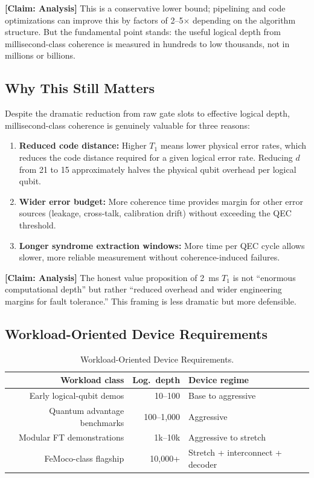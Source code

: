 \documentclass[conference]{IEEEtran}
\begin{document}
\textbf{[Claim: Analysis]} This is a conservative lower bound; pipelining and code optimizations can improve this by factors of 2--5$\times$ depending on the algorithm structure. But the fundamental point stands: the useful logical depth from millisecond-class coherence is measured in hundreds to low thousands, not in millions or billions.

\subsection{Why This Still Matters}

Despite the dramatic reduction from raw gate slots to effective logical depth, millisecond-class coherence is genuinely valuable for three reasons:

\begin{enumerate}
\item \textbf{Reduced code distance:} Higher $T_1$ means lower physical error rates, which reduces the code distance required for a given logical error rate. Reducing $d$ from 21 to 15 approximately halves the physical qubit overhead per logical qubit.
\item \textbf{Wider error budget:} More coherence time provides margin for other error sources (leakage, cross-talk, calibration drift) without exceeding the QEC threshold.
\item \textbf{Longer syndrome extraction windows:} More time per QEC cycle allows slower, more reliable measurement without coherence-induced failures.
\end{enumerate}

\textbf{[Claim: Analysis]} The honest value proposition of 2~ms $T_1$ is not ``enormous computational depth'' but rather ``reduced overhead and wider engineering margins for fault tolerance.'' This framing is less dramatic but more defensible.

\subsection{Workload-Oriented Device Requirements}

\begin{table}[htbp]
\centering
\caption{Workload-Oriented Device Requirements.}
\label{tab:workload_reqs}
\begin{tabular}{rrp{3cm}}
\toprule
\textbf{Workload class} & \textbf{Log.\ depth} & \textbf{Device regime} \\
\midrule
Early logical-qubit demos & 10--100 & Base to aggressive \\
Quantum advantage benchmarks & 100--1,000 & Aggressive \\
Modular FT demonstrations & 1k--10k & Aggressive to stretch \\
FeMoco-class flagship & 10,000+ & Stretch + interconnect + decoder \\
\bottomrule
\end{tabular}
\end{table}
\end{document}
